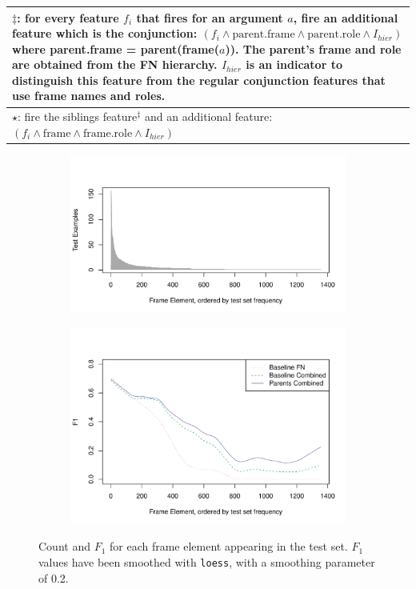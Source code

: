 \documentclass[11pt,a4paper]{article}
\begin{document}
\begin{table}
\begin{small}
\begin{tabular}{|l|c|c|c|c|c|c|}
 \multicolumn{7}{p{14cm}}{$\ddagger$: for every feature $f_i$ that fires for an argument $a$, fire an additional feature which is the conjunction: $(f_i \wedge \textrm{parent.frame} \wedge \textrm{parent.role} \wedge I_{hier})$ where parent.frame = parent(frame($a$)). The parent's frame and role are obtained from the FN hierarchy. $I_{hier}$ is an indicator to distinguish this feature from the regular conjunction features that use frame names and roles.}\\ \hline
 \multicolumn{7}{p{14cm}}{$\star$: fire the siblings feature$^\ddagger$ and an additional feature: $(f_i \wedge \textrm{frame} \wedge \textrm{frame.role} \wedge I_{hier})$}\\ \hline
 \end{tabular}
 \end{small}
 \end{table}


\begin{figure}[t]
	\begin{subfigure}[b]{0.5\textwidth}
		\includegraphics[width=\textwidth]{fig/num_instances}
	\end{subfigure}
	\begin{subfigure}[b]{0.5\textwidth}
		\vspace{-1cm}
		\includegraphics[width=\textwidth]{fig/f1_sorted_by_num_instances}
	\end{subfigure}
	\caption{Count and $F_1$ for each frame element appearing in the test set. $F_1$ values have been smoothed with \texttt{loess}, with a smoothing parameter of 0.2.}
\end{figure}
\end{document}
